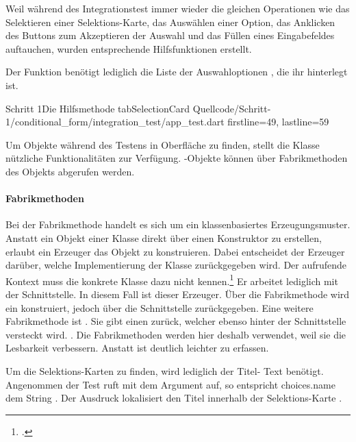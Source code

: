 Weil während des Integrationstest immer wieder die gleichen Operationen wie das Selektieren einer Selektions-Karte, das Auswählen einer Option, das Anklicken des Buttons zum Akzeptieren der Auswahl und das Füllen eines Eingabefeldes auftauchen, wurden entsprechende Hilfsfunktionen erstellt.


Der Funktion  \Lst{\ref{lst:Schritt1HilfsmethodeTabSelectionCard}} benötigt lediglich die Liste der Auswahloptionen , die ihr hinterlegt ist.
 

\begin{alexlisting}{Schritt 1}{Die Hilfsmethode tabSelectionCard}
  {Quellcode/Schritt-1/conditional_form/integration_test/app_test.dart}
  {firstline=49, lastline=59}
  \label{lst:Schritt1HilfsmethodeTabSelectionCard}
\end{alexlisting}

Um Objekte während des Testens in Oberfläche zu finden, stellt die Klasse  nützliche Funktionalitäten zur Verfügung. -Objekte können über Fabrikmethoden des Objekts  abgerufen werden.

\paragraph{Fabrikmethoden}
Bei der Fabrikmethode handelt es sich um ein klassenbasiertes Erzeugungsmuster. Anstatt ein Objekt einer Klasse direkt über einen Konstruktor zu erstellen, erlaubt ein Erzeuger das Objekt zu konstruieren. Dabei entscheidet der Erzeuger darüber, welche Implementierung der Klasse zurückgegeben wird. Der aufrufende Kontext muss die konkrete Klasse dazu nicht kennen.\footcite[Vgl.][107-116]{gamma2009entwurfsmuster} Er arbeitet lediglich mit der Schnittstelle. In diesem Fall ist  dieser Erzeuger. Über die Fabrikmethode  wird ein  konstruiert, jedoch über die Schnittstelle  zurückgegeben. Eine weitere Fabrikmethode ist . Sie gibt einen  zurück, welcher ebenso hinter der Schnittstelle  versteckt wird. . Die Fabrikmethoden werden hier deshalb verwendet, weil sie die Lesbarkeit verbessern. Anstatt  ist  deutlich leichter zu erfassen.



Um die Selektions-Karten zu finden, wird lediglich der Titel- Text benötigt. Angenommen der Test ruft  mit dem Argument  auf, so entspricht choices.name dem String . Der Ausdruck  lokalisiert den Titel innerhalb der Selektions-Karte . 


